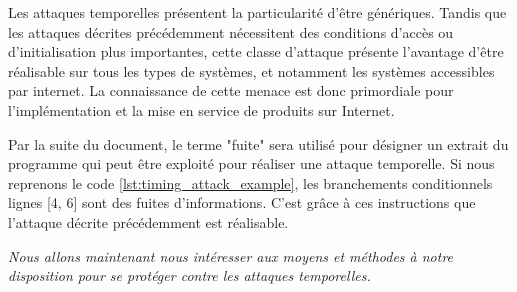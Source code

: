 Les attaques temporelles présentent la particularité d'être génériques. Tandis que les attaques décrites précédemment nécessitent des conditions d'accès ou d'initialisation plus importantes, cette classe d'attaque présente l'avantage d'être réalisable sur tous les types de systèmes, et notamment les systèmes accessibles par internet. La connaissance de cette menace est donc primordiale pour l'implémentation et la mise en service de produits sur Internet.\medbreak

Par la suite du document, le terme "fuite" sera utilisé pour désigner un extrait du programme qui peut être exploité pour réaliser une attaque temporelle. Si nous reprenons le code \ref{lst:timing_attack_example}, les branchements conditionnels lignes [4, 6] sont des fuites d'informations. C'est grâce à ces instructions que l'attaque décrite précédemment est réalisable.\medbreak

\raggedbottom
\textit{Nous allons maintenant nous intéresser aux moyens et méthodes à notre disposition pour se protéger contre les attaques temporelles.}



